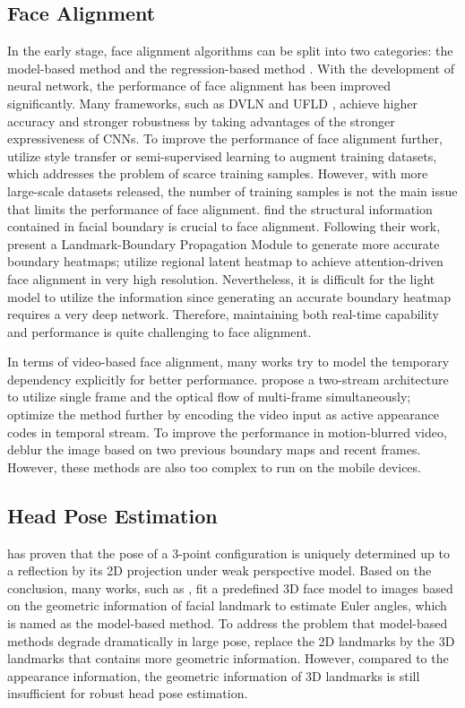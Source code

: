 \documentclass[3p,twocolumn, round, sort & compress]{elsarticle}
\begin{document}
\subsection{Face Alignment}
In the early stage, face alignment algorithms can be split into two categories: the model-based method \citep{CE-CLM} and the regression-based method \citep{ESR, SDM, CFSS, ACFSS}. With the development of neural network, the performance of face alignment has been improved significantly. Many frameworks, such as DVLN \citep{DVLN} and UFLD \citep{TUF}, achieve higher accuracy and stronger robustness by taking advantages of the stronger expressiveness of CNNs. To improve the performance of face alignment further, \citep{SAN, AVS, 3FabRec, DeCaFA, SBR} utilize style transfer or semi-supervised learning to augment training datasets, which addresses the problem of scarce training samples. However, with more large-scale datasets \citep{LAB, LAPA} released, the number of training samples is not the main issue that limits the performance of face alignment. \citep{LAB} find the structural information contained in facial boundary is crucial to face alignment. Following their work, \citep{PropNet} present a Landmark-Boundary Propagation Module to generate more accurate boundary heatmaps; \citep{ADC} utilize regional latent heatmap to achieve attention-driven face alignment in very high resolution. Nevertheless, it is difficult for the light model \citep{KWTQ, RFA} to utilize the information since generating an accurate boundary heatmap requires a very deep network. Therefore, maintaining both real-time capability and performance is quite challenging to face alignment.

In terms of video-based face alignment, many works try to model the temporary dependency explicitly for better performance. \citep{Two-Stream-action} propose a two-stream architecture to utilize single frame and the optical flow of multi-frame simultaneously; \citep{Two-stream_video} optimize the method further by encoding the video input as active appearance codes in temporal stream. To improve the performance in motion-blurred video, \citep{FAB} deblur the image based on two previous boundary maps and recent frames. However, these methods are also too complex to run on the mobile devices. 

\subsection{Head Pose Estimation}
\citep{U3D-pose} has proven that the pose of a 3-point configuration is uniquely determined up to a reflection by its 2D projection under weak perspective model. Based on the conclusion, many works, such as \citep{accurate_model}, fit a predefined 3D face model to images based on the geometric information of facial landmark to estimate Euler angles, which is named as the model-based method. To address the problem that model-based methods degrade dramatically in large pose, \citep{Openface} replace the 2D landmarks by the 3D landmarks \citep{CE-CLM} that contains more geometric information. However, compared to the appearance information, the geometric information of 3D landmarks is still insufficient for robust head pose estimation.
\end{document}
